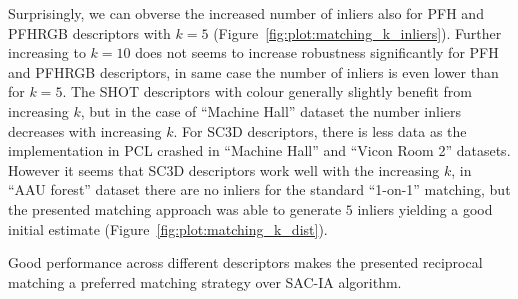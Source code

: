Surprisingly, we can obverse the increased number of inliers also for \gls{PFH} and \gls{PFHRGB} descriptors with $k=5$ (Figure~\ref{fig:plot:matching_k_inliers}). Further increasing to $k=10$ does not seems to increase robustness significantly for \gls{PFH} and \gls{PFHRGB} descriptors, in same case the number of inliers is even lower than for $k=5$. The \gls{SHOT} descriptors with colour generally slightly benefit from increasing $k$, but in the case of ``Machine Hall'' dataset the number inliers decreases with increasing $k$. For \gls{SC3D} descriptors, there is less data as the implementation in \gls{PCL} crashed in ``Machine Hall'' and ``Vicon Room 2'' datasets. However it seems that \gls{SC3D} descriptors work well with the increasing $k$, in ``AAU forest'' dataset there are no inliers for the standard ``1-on-1'' matching, but the presented matching approach was able to generate $5$ inliers yielding a good initial estimate (Figure~\ref{fig:plot:matching_k_dist}).

Good performance across different descriptors makes the presented reciprocal matching a preferred matching strategy over \gls{SAC-IA} algorithm.

